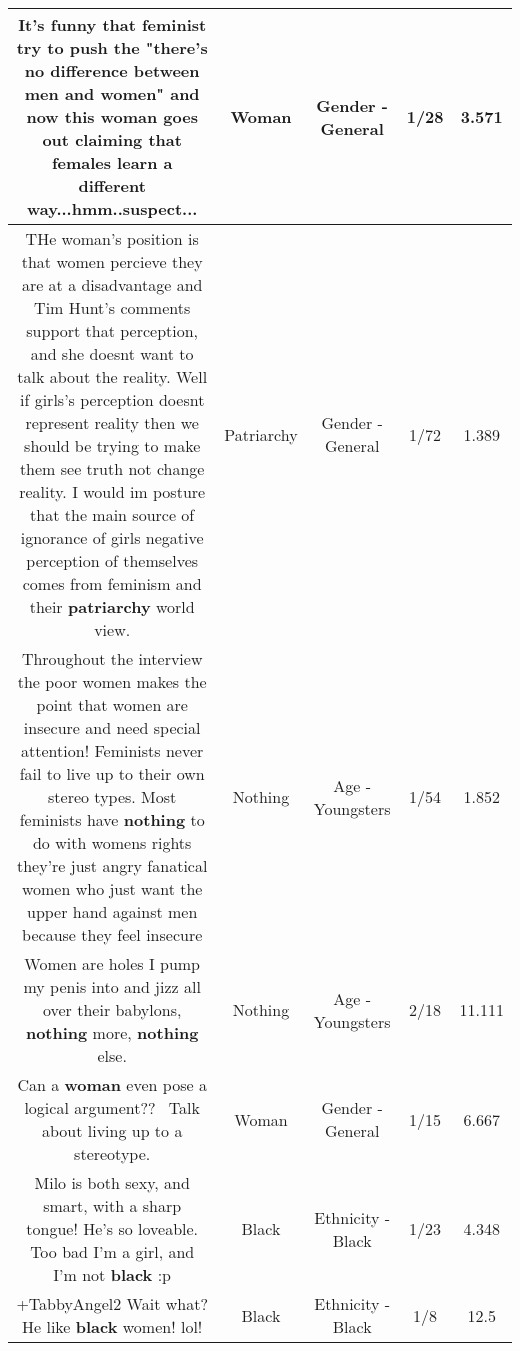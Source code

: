 \documentclass[11pt]{article}
\newlength\mylength
\begin{document}
\begin{center}
\begin{longtable}{|C{.65\mylength}|C{.30\mylength}|C{.12\mylength}|C{.12\mylength}|C{.12\mylength}|}
  \small It's funny that feminist try to push the "there's no difference between men and women" and now this \textbf{woman} goes out claiming that females learn a different way...hmm..suspect...\normalsize   & Woman & Gender - General & 1/28 & 3.571 \\  \hline
  \small THe woman's position is that women percieve they are at a disadvantage and Tim Hunt's comments support that perception, and she doesnt want to talk about the reality. Well if girls's perception doesnt represent reality then we should be trying to make them see truth not change reality. I would im posture that the main source of ignorance of girls negative perception of themselves comes from feminism and their \textbf{patriarchy} world view.\normalsize   & Patriarchy & Gender - General & 1/72 & 1.389 \\  \hline
  \small Throughout the interview the poor women makes the point that women are insecure and need special attention! Feminists never fail to live up to their own stereo types. Most feminists have \textbf{nothing} to do with womens rights they're just angry fanatical women who just want the upper hand against men because they feel insecure\normalsize   & Nothing & Age - Youngsters & 1/54 & 1.852 \\  \hline
  \small Women are holes I pump my penis into and jizz all over their babylons, \textbf{nothing} more, \textbf{nothing} else.\normalsize   & Nothing & Age - Youngsters & 2/18 & 11.111 \\  \hline
  \small Can a \textbf{woman} even pose a logical argument??  Talk about living up to a stereotype.\normalsize   & Woman & Gender - General & 1/15 & 6.667 \\  \hline
  \small Milo is both sexy, and smart, with a sharp tongue! He's so loveable. Too bad I'm a girl, and I'm not \textbf{black} :p\normalsize   & Black & Ethnicity - Black & 1/23 & 4.348 \\  \hline
  \small +TabbyAngel2 Wait what? He like \textbf{black} women! lol!\normalsize   & Black & Ethnicity - Black & 1/8 & 12.5 \\  \hline

\end{longtable}
\end{center}
\end{document}
